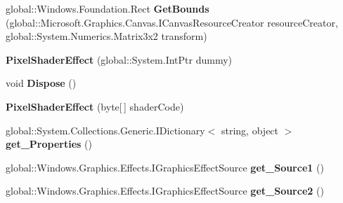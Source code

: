 \begin{DoxyCompactItemize}
global\+::\+Windows.\+Foundation.\+Rect {\bfseries Get\+Bounds} (global\+::\+Microsoft.\+Graphics.\+Canvas.\+I\+Canvas\+Resource\+Creator resource\+Creator, global\+::\+System.\+Numerics.\+Matrix3x2 transform)
\item 
\mbox{\label{class_microsoft_1_1_graphics_1_1_canvas_1_1_effects_1_1_pixel_shader_effect_a5f63570cf9a9453f0d96f88c1c811ec8}} 
{\bfseries Pixel\+Shader\+Effect} (global\+::\+System.\+Int\+Ptr dummy)
\item 
\mbox{\label{class_microsoft_1_1_graphics_1_1_canvas_1_1_effects_1_1_pixel_shader_effect_a40ea7bc41c5990f325f933e0a0881f9a}} 
void {\bfseries Dispose} ()
\item 
\mbox{\label{class_microsoft_1_1_graphics_1_1_canvas_1_1_effects_1_1_pixel_shader_effect_ae634b2439aa46fb75d92d21c5e6af991}} 
{\bfseries Pixel\+Shader\+Effect} (byte\mbox{[}$\,$\mbox{]} shader\+Code)
\item 
\mbox{\label{class_microsoft_1_1_graphics_1_1_canvas_1_1_effects_1_1_pixel_shader_effect_aa9cc971756f66f475d464b75ad4408e0}} 
global\+::\+System.\+Collections.\+Generic.\+I\+Dictionary$<$ string, object $>$ {\bfseries get\+\_\+\+Properties} ()
\item 
\mbox{\label{class_microsoft_1_1_graphics_1_1_canvas_1_1_effects_1_1_pixel_shader_effect_ab9532ff2935e7e1a6de0133ab7b0c1a6}} 
global\+::\+Windows.\+Graphics.\+Effects.\+I\+Graphics\+Effect\+Source {\bfseries get\+\_\+\+Source1} ()
\item 
\mbox{\label{class_microsoft_1_1_graphics_1_1_canvas_1_1_effects_1_1_pixel_shader_effect_a2e2e6417703fab0906196222dae0f84c}} 
global\+::\+Windows.\+Graphics.\+Effects.\+I\+Graphics\+Effect\+Source {\bfseries get\+\_\+\+Source2} ()
\item 
\mbox{\label{class_microsoft_1_1_graphics_1_1_canvas_1_1_effects_1_1_pixel_shader_effect_a5acf8d1922a7b1252c1d8dd3f5b0161e}} 

\end{DoxyCompactItemize}
